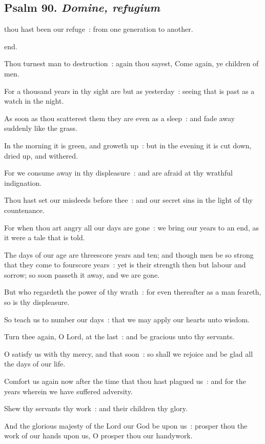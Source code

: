 \subsection{Psalm 90. \textit{Domine, refugium}}

 thou hast been our refuge~: from one generation to another.\par
\noindent
end.\par
{}Thou turnest man to destruction~: again thou sayest, Come again, ye children of men.\par
{}For a thousand years in thy sight are but as yesterday~: seeing that is past as a watch in the night.\par
{}As soon as thou scatterest them they are even as a sleep~: and fade away suddenly like the grass.\par
{}In the morning it is green, and groweth up~: but in the evening it is cut down, dried up, and withered.\par
{}For we consume away in thy displeasure~: and are afraid at thy wrathful indignation.\par
{}Thou hast set our misdeeds before thee~: and our secret sins in the light of thy countenance.\par
{}For when thou art angry all our days are gone~: we bring our years to an end, as it were a tale that is told.\par
{}The days of our age are threescore years and ten; and though men be so strong that they come to fourscore years~: yet is their strength then but labour and sorrow; so soon passeth it away, and we are gone.\par
{}But who regardeth the power of thy wrath~: for even thereafter as a man feareth, so is thy displeasure.\par
{}So teach us to number our days~: that we may apply our hearts unto wisdom.\par
{}Turn thee again, O Lord, at the last~: and be gracious unto thy servants.\par
{}O satisfy us with thy mercy, and that soon~: so shall we rejoice and be glad all the days of our life.\par
{}Comfort us again now after the time that thou hast plagued us~: and for the years wherein we have suffered adversity.\par
{}Shew thy servants thy work~: and their children thy glory.\par
{}And the glorious majesty of the Lord our God be upon us~: prosper thou the work of our hands upon us, O prosper thou our handywork.\par

